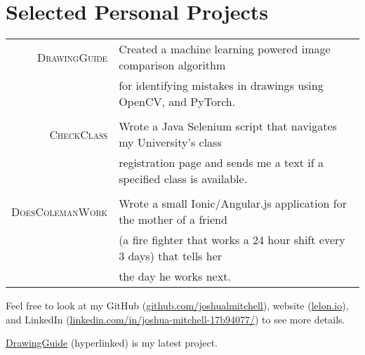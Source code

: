 \documentclass[a4paper,10pt]{article}
\begin{document}
\section{Selected Personal Projects}
\begin{tabular}{rl}
 \textsc{DrawingGuide} & Created a machine learning powered image comparison algorithm \\
 
 & 
 
for identifying mistakes in drawings using OpenCV, and PyTorch. \\

& \\
\textsc{CheckClass} & Wrote a Java Selenium script that navigates my University’s class \\
& registration page and sends me a text if a specified class is available. \\

& \\
\textsc{DoesColemanWork} & Wrote a small Ionic/Angular.js application for the mother of a friend \\
& (a fire fighter that works a 24 hour shift every 3 days) that tells her \\

& the day he works next. \\
\end{tabular}

Feel free to look at my GitHub (\href {https://github.com/joshualmitchell}{github.com/joshualmitchell}), website (\href {http://lelon.io/blog/2018/01/04/to-potential-employers}{lelon.io}), and LinkedIn (\href{https://www.linkedin.com/in/joshua-mitchell-17b94077/}{linkedin.com/in/joshua-mitchell-17b94077/}) to see more details.

\href {https://github.com/joshualmitchell/DrawingGuide}{DrawingGuide} (hyperlinked) is my latest project.
\end{document}
